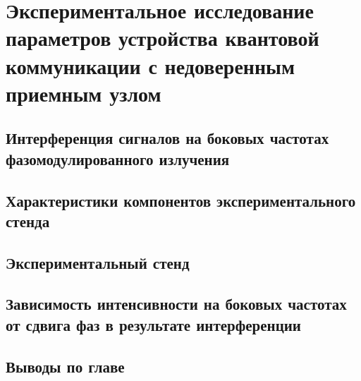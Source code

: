 \chapter{Экспериментальное исследование параметров устройства квантовой коммуникации с недоверенным приемным узлом} \label{ch:ch5}
\section{Интерференция сигналов на боковых частотах фазомодулированного излучения} \label{sec:ch5/sec1}




\section{Характеристики компонентов экспериментального стенда} \label{ch:ch5/sect2}


\section{Экспериментальный стенд} \label{ch:ch5/sect3}


\section{Зависимость интенсивности на боковых частотах от сдвига фаз в результате интерференции} \label{ch:ch5/sect4}


\section{Выводы по главе} \label{ch:ch5/sect5}
